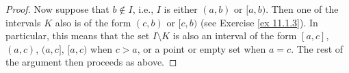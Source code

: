 \begin{proof}
    Now suppose that \(b \notin I\), i.e., \(I\) is either \((a, b)\) or \([a, b)\).
    Then one of the intervals \(K\) also is of the form \((c, b)\) or \([c, b)\) (see Exercise \ref{ex 11.1.3}).
            In particular, this means that the set \(I \setminus K\) is also an interval of the form \([a, c]\), \((a, c)\), \((a, c]\), \([a, c)\) when \(c > a\), or a point or empty set when \(a = c\).
    The rest of the argument then proceeds as above.
\end{proof}

\begin{exercise}\label{ex 11.1.3}

\end{exercise}